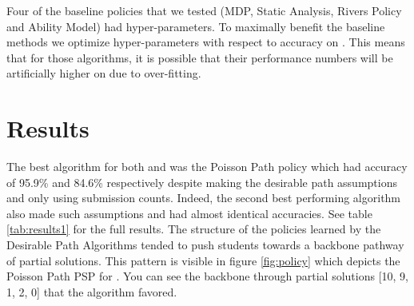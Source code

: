 Four of the baseline policies that we tested (MDP, Static Analysis, Rivers Policy and Ability Model) had hyper-parameters. To maximally benefit the baseline methods we optimize hyper-parameters with respect to accuracy on \Pa. This means that for those algorithms, it is possible that their performance numbers will be artificially higher on \Pa due to over-fitting.

\section{Results}

The best algorithm for both \Pa and \Pb was the Poisson Path policy which had accuracy of 95.9\% and 84.6\% respectively despite making the desirable path assumptions and only using submission counts. Indeed, the second best performing algorithm also made such assumptions and had almost identical accuracies. See table \ref{tab:results1} for the full results. The structure of the policies learned by the Desirable Path Algorithms tended to push students towards a backbone pathway of partial solutions. This pattern is visible in figure \ref{fig:policy} which depicts the Poisson Path PSP for \Pa\hspace{-0.5mm}. You can see the backbone through partial solutions [10, 9, 1, 2, 0] that the algorithm favored. 

